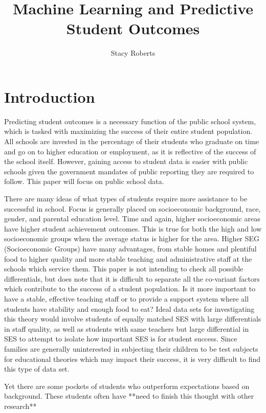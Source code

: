 \documentclass[fleqn,10pt]{olplainarticle}
\title{Machine Learning and Predictive Student Outcomes}
\author{Stacy Roberts}
\affil{robers23@utexas.edu}
\begin{document}
\flushbottom
\maketitle
\thispagestyle{empty}

\section*{Introduction}

Predicting student outcomes is a necessary function of the public school system, which is tasked with maximizing the success of their entire student population. All schools are invested in the percentage of their students who graduate on time and go on to higher education or employment, as it is reflective of the success of the school itself. However, gaining access to student data is easier with public schools given the government mandates of public reporting they are required to follow. \citep{ecsa} This paper will focus on public school data.

There are many ideas of what types of students require more assistance to be successful in school. Focus is generally placed on socioeconomic background, race, gender, and parental education level. \citep{Bradley2022SESgap}  Time and again, higher socioeconomic areas have higher student achievement outcomes. This is true for both the high and low socioeconomic groups when the average status is higher for the area.  Higher SEG (Socioeconomic Groups) have many advantages, from stable homes and plentiful food to higher quality and more stable teaching and administrative staff at the schools which service them. \citep{HSEffectsLongTerm} This paper is not intending to check all possible differentials, but does note that it is difficult to separate all the co-variant factors which contribute to the success of a student population. Is it more important to have a stable, effective teaching staff or to provide a support system where all students have stability and enough food to eat? Ideal data sets for investigating this theory would involve students of equally matched SES with large differentials in staff quality, as well as students with same teachers but large differential in SES to attempt to isolate how important SES is for student success. Since families are generally uninterested in subjecting their children to be test subjects for educational theories which may impact their success, it is very difficult to find this type of data set.

Yet there are some pockets of students who outperform expectations based on background. \citep{YanGaiLowSEG} These students often have **need to finish this thought with other research**
\end{document}
